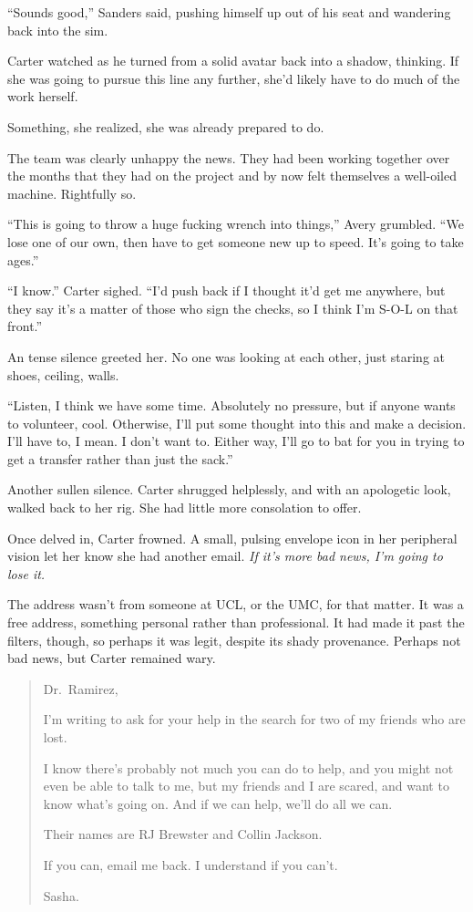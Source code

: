 ``Sounds good,'' Sanders said, pushing himself up out of his seat and wandering back into the sim.

Carter watched as he turned from a solid avatar back into a shadow, thinking. If she was going to pursue this line any further, she'd likely have to do much of the work herself.

Something, she realized, she was already prepared to do.

The team was clearly unhappy the news. They had been working together over the months that they had on the project and by now felt themselves a well-oiled machine. Rightfully so.

``This is going to throw a huge fucking wrench into things,'' Avery grumbled. ``We lose one of our own, then have to get someone new up to speed. It's going to take ages.''

``I know.'' Carter sighed. ``I'd push back if I thought it'd get me anywhere, but they say it's a matter of those who sign the checks, so I think I'm S-O-L on that front.''

An tense silence greeted her. No one was looking at each other, just staring at shoes, ceiling, walls.

``Listen, I think we have some time. Absolutely no pressure, but if anyone wants to volunteer, cool. Otherwise, I'll put some thought into this and make a decision. I'll have to, I mean. I don't want to. Either way, I'll go to bat for you in trying to get a transfer rather than just the sack.''

Another sullen silence. Carter shrugged helplessly, and with an apologetic look, walked back to her rig. She had little more consolation to offer.

Once delved in, Carter frowned. A small, pulsing envelope icon in her peripheral vision let her know she had another email. \emph{If it's more bad news, I'm going to lose it.}

The address wasn't from someone at UCL, or the UMC, for that matter. It was a free address, something personal rather than professional. It had made it past the filters, though, so perhaps it was legit, despite its shady provenance. Perhaps not bad news, but Carter remained wary.

\begin{quote}
Dr.~Ramirez,

I'm writing to ask for your help in the search for two of my friends who are lost.

I know there's probably not much you can do to help, and you might not even be able to talk to me, but my friends and I are scared, and want to know what's going on. And if we can help, we'll do all we can.

Their names are RJ Brewster and Collin Jackson.

If you can, email me back. I understand if you can't.

Sasha.
\end{quote}

